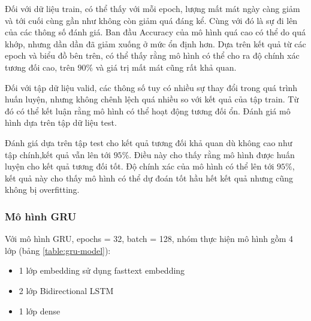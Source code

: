 Đối với dữ liệu train, có thể thấy với mỗi epoch, lượng mất mát ngày càng giảm và tới cuối cùng gần như không còn giảm quá đáng kể. Cùng với đó là sự đi lên của các thông số đánh giá. Ban đầu Accuracy của mô hình quá cao có thể do quá khớp, nhưng dần dần đã giảm xuống ở mức ổn định hơn. Dựa trên kết quả từ các epoch và biểu đồ bên trên, có thể thấy rằng mô hình có thể cho ra độ chính xác tương đối cao, trên $90\%$ và giá trị mất mát cũng rất khả quan.

Đối với tập dữ liệu valid, các thông số tuy có nhiều sự thay đổi trong quá trình huấn
luyện, nhưng không chênh lệch quá nhiều so với kết quả của tập train. Từ đó có thể kết
luận rằng mô hình có thể hoạt động tương đối ổn.
Đánh giá mô hình dựa trên tập dữ liệu test.

Đánh giá dựa trên tập test cho kết quả tương đối khả quan dù không cao như tập chính,kết quả vẫn lên tới $95\%$. Điều này cho thấy rằng mô hình được huấn luyện cho kết quả tương đối tốt. Độ chính xác của mô hình có thể lên tới $95\%$, kết quả này cho thấy mô hình có thể dự đoán tốt hầu hết kết quả nhưng cũng không bị overfitting.


\subsubsection{Mô hình GRU}
Với mô hình GRU, epochs = 32, batch = 128, nhóm thực hiện mô hình gồm 4 lớp (bảng \ref{table:gru-model}):
\begin{itemize}
    \item 1 lớp embedding sử dụng fasttext embedding
    \item 2 lớp Bidirectional LSTM
    \item 1 lớp dense
\end{itemize}

